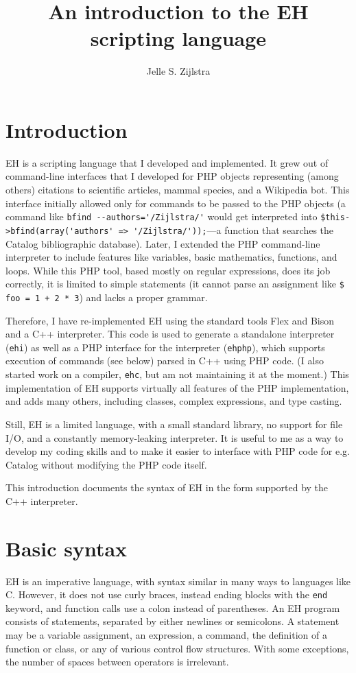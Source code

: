 \documentclass{article}
\begin{document}
\title{An introduction to the EH scripting language}
\author{Jelle S. Zijlstra}
\maketitle
\tableofcontents
\pagebreak
\section{Introduction}
EH is a scripting language that I developed and implemented. It grew out of command-line interfaces that I developed for PHP objects representing (among others) citations to scientific articles, mammal species, and a Wikipedia bot. This interface initially allowed only for commands to be passed to the PHP objects (a command like \verb#bfind --authors='/Zijlstra/'# would get interpreted into \verb#$this->bfind(array('authors' => '/Zijlstra/'));#---a function that searches the Catalog bibliographic database). Later, I extended the PHP command-line interpreter to include features like variables, basic mathematics, functions, and loops. While this PHP tool, based mostly on regular expressions, does its job correctly, it is limited to simple statements (it cannot parse an assignment like \verb#$ foo = 1 + 2 * 3#) and lacks a proper grammar.

Therefore, I have re-implemented EH using the standard tools Flex and Bison and a C++ interpreter. This code is used to generate a standalone interpreter (\verb#ehi#) as well as a PHP interface for the interpreter (\verb#ehphp#), which supports execution of commands (see below) parsed in C++ using PHP code. (I also started work on a compiler, \verb#ehc#, but am not maintaining it at the moment.) This implementation of EH supports virtually all features of the PHP implementation, and adds many others, including classes, complex expressions, and type casting.

Still, EH is a limited language, with a small standard library, no support for file I/O, and a constantly memory-leaking interpreter. It is useful to me as a way to develop my coding skills and to make it easier to interface with PHP code for e.g. Catalog without modifying the PHP code itself.

This introduction documents the syntax of EH in the form supported by the C++ interpreter.

\section{Basic syntax}
EH is an imperative language, with syntax similar in many ways to languages like C. However, it does not use curly braces, instead ending blocks with the \verb#end# keyword, and function calls use a colon instead of parentheses. An EH program consists of statements, separated by either newlines or semicolons. A statement may be a variable assignment, an expression, a command, the definition of a function or class, or any of various control flow structures. With some exceptions, the number of spaces between operators is irrelevant.
\end{document}
